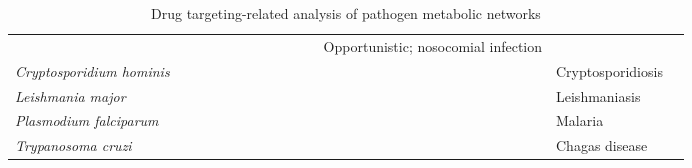 \begin{sidewaystable}
\begin{tabular}{ l  c  c  c  c  c  c  c  c | c  c | c l l }
     \cellcolor[gray]{0.8} & \cellcolor[gray]{0.8} & & \cellcolor[gray]{0.8} & 
     & & & & \cellcolor[gray]{0.8} & & 
     & Opportunistic; nosocomial infection & \cite{Navid:2009en} \\ \cline{2-12}
\textit{Cryptosporidium hominis} & 
     \cellcolor[gray]{0.8} & & & & 
     & & & & \cellcolor[gray]{0.8} & & 
     & Cryptosporidiosis & \cite{Vanee:2010du} \\ \cline{2-12}
\textit{Leishmania major} & 
     \cellcolor[gray]{0.8} & \cellcolor[gray]{0.8} & & \cellcolor[gray]{0.8} & 
     & \cellcolor[gray]{0.8} & & & \cellcolor[gray]{0.8} & & 
     & Leishmaniasis & \cite{Chavali:2008gh} \\ \cline{2-12}
\textit{Plasmodium falciparum} & 
     \cellcolor[gray]{0.8} & & & \cellcolor[gray]{0.8} & 
     & & & & \cellcolor[gray]{0.8} & \cellcolor[gray]{0.8} & \cellcolor[gray]{0.8}
     & Malaria & \cite{Huthmacher:2010hi,Plata:2010dw} \\ \cline{2-12}
\textit{Trypanosoma cruzi} & 
     \cellcolor[gray]{0.8} & & & & \cellcolor[gray]{0.8}
     & & & & \cellcolor[gray]{0.8} & &
     & Chagas disease & \cite{Roberts:2009dl} \\ %
\end{tabular}
\caption[Drug targeting-related analysis of pathogen metabolic networks]{
          Drug targeting-related analysis of pathogen metabolic networks}
\label{trends:table1}
\end{sidewaystable}